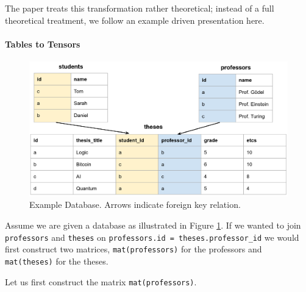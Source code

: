 \documentclass{paper}
\begin{document}
	The paper \cite{hu2021tcudb} treats this transformation rather theoretical; instead of a full theoretical treatment, we follow an example driven presentation here.
	
	\paragraph{Tables to Tensors}
	
	\begin{figure}
		\centering
		\includegraphics[width=0.9\linewidth]{schema1}
		\caption{Example Database. Arrows indicate foreign key relation.}
		\label{fig:schema1}
	\end{figure}
	
	
	Assume we are given a database as illustrated in Figure \ref{fig:schema1}. If we wanted to join \texttt{professors} and \texttt{theses} on \texttt{professors.id = theses.professor\_id} we would first construct two matrices, \texttt{mat(professors)} for the professors and \texttt{mat(theses)} for the theses.   
	
	Let us first construct the matrix \texttt{mat(professors)}.
	
\end{document}
